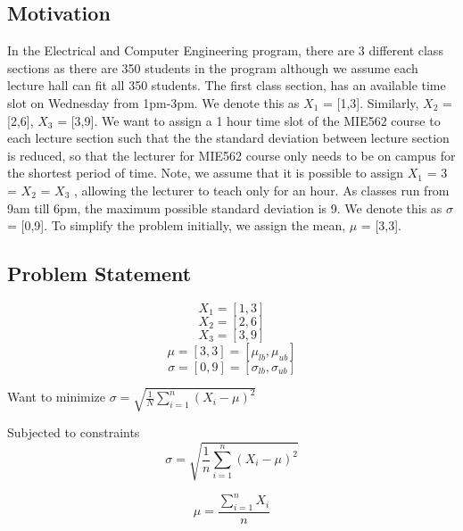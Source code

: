 \documentclass[a4paper,12pt]{article}
\begin{document}
\subsection{Motivation} 
In the Electrical and Computer Engineering program, there are 3 different class sections as there are 350 students in the program although we assume each lecture hall can fit all 350 students. The first class section, has an available time slot on Wednesday from 1pm-3pm. We denote this as $X_{1}$ = [1,3]. Similarly, $X_{2}$ = [2,6], $X_{3}$ = [3,9]. We want to assign a 1 hour time slot of the MIE562 course to each lecture section such that the the standard deviation between lecture section is reduced, so that the lecturer for MIE562 course only needs to be on campus for the shortest period of time. Note, we assume that it is possible to assign $X_{1}$ = 3 = $X_{2}$ = $X_{3}$ , allowing the lecturer to teach only for an hour. As classes run from 9am till 6pm, the maximum possible standard deviation is 9. We denote this as $\sigma$ = [0,9]. 
To simplify the problem initially, we assign the mean, $\mu$ = [3,3]. 

\subsection{Problem Statement}
\begin{equation}
 \label{XONE} X_{1} = [1,3] 
\end{equation} 
\begin{equation}
 \label{XTWO} X_{2} = [2,6] 
\end{equation} 
\begin{equation}
 \label{XTHREE} X_{3} = [3,9] 
\end{equation} 
\begin{equation}
\label{MEAN} \mu = [3,3] = [\mu_{lb}, \mu_{ub}]
\end{equation} 
\begin{equation}
\label{SD} \sigma = [0,9] =  [\sigma_{lb}, \sigma_{ub}]
\end{equation} 

Want to minimize $\sigma = \sqrt{ \frac{1}{N} \sum\limits_{i=1}^n (X_{i} - \mu)^2}$

Subjected to constraints
\begin{equation}
\label{CONSSD} \sigma = \sqrt{ \frac{1}{n} \sum\limits_{i=1}^n (X_{i} - \mu)^2} 
\end{equation} 

$$ \mu = \frac{\sum\limits_{i=1}^n X_{i}}{n}$$
\end{document}
